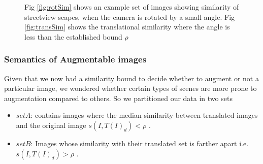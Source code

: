 \begin{figure}[!t]
	\centering
	\hspace*{-5mm}
	\vspace{-0.4cm}
	\caption{ Fig \ref{fig:rotSim} shows an example set of images showing similarity of streetview scapes, when the camera is rotated by a small angle. Fig \ref{fig:transSim} shows the translational similarity where the angle is less than the established bound $\rho$ }
	\vspace{-0.4cm}
\end{figure}


\subsubsection{Semantics of Augmentable images}
Given that we now had a similarity bound to decide whether to augment or not a particular image, we wondered whether certain types of scenes are more prone to augmentation compared to others.  So we partitioned our data in two sets
\begin{itemize}
	\item $set A$: contains images where the median similarity  between translated images and the original image ${s(I,T(I)_d)} < \rho$ .
	
	\item $set B$:  Images whose similarity with their translated set is farther apart i.e. ${s(I,T(I)_d)} > \rho$ .
\end{itemize}

